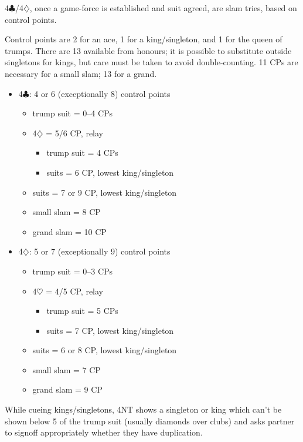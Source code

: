 \documentclass[a4paper,14pt]{extarticle}
\begin{document}
4$\clubsuit$/4$\diamondsuit$, once a game-force is established and suit agreed, are slam tries, based
on control points.

Control points are 2 for an ace, 1 for a king/singleton, and 1 for the queen of
trumps.  There are 13 available from honours; it is possible to substitute
outside singletons for kings, but care must be taken to avoid double-counting.
11 CPs are necessary for a small slam; 13 for a grand.

\begin{itemize}
\item 4$\clubsuit$: 4 or 6 (exceptionally 8) control points
	\begin{itemize}
   \item trump suit = 0--4 CPs
   \item 4$\diamondsuit$ = 5/6 CP, relay
		\begin{itemize}
      \item trump suit = 4 CPs
      \item suits = 6 CP, lowest king/singleton
		\end{itemize}
   \item suits = 7 or 9 CP, lowest king/singleton
   \item small slam = 8 CP
   \item grand slam = 10 CP
	\end{itemize}

\item 4$\diamondsuit$: 5 or 7 (exceptionally 9) control points
	\begin{itemize}
   \item trump suit = 0--3 CPs
   \item 4$\heartsuit$ = 4/5 CP, relay
		\begin{itemize}
      \item trump suit = 5 CPs
      \item suits = 7 CP, lowest king/singleton
		\end{itemize}
   \item suits = 6 or 8 CP, lowest king/singleton
   \item small slam = 7 CP
   \item grand slam = 9 CP
	\end{itemize}
\end{itemize}

While cueing kings/singletons, 4NT shows a singleton or king which can't be
shown below 5 of the trump suit (usually diamonds over clubs) and asks partner
to signoff appropriately whether they have duplication.
\end{document}
